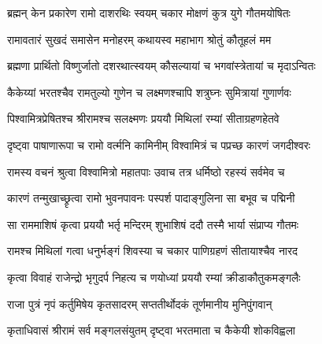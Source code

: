 


\storymeta



\twolineshloka
{ब्रह्मन् केन प्रकारेण रामो दाशरथिः स्वयम्}
{चकार मोक्षणं कुत्र युगे गौतमयोषितः}%


\twolineshloka
{रामावतारं सुखदं समासेन मनोहरम्}
{कथायस्व महाभाग श्रोतुं कौतूहलं मम}%


\twolineshloka
{ब्रह्मणा प्रार्थितो विष्णुर्जातो दशरथात्स्वयम्}
{कौसल्यायां च भगवांस्त्रेतायां च मृदाऽन्वितः}%


\twolineshloka
{कैकेय्यां भरतश्चैव रामतुल्यो गुणेन च}
{लक्ष्मणश्चापि शत्रुघ्नः सुमित्रायां गुणार्णवः}%


\twolineshloka
{पिश्वामित्रप्रेषितश्च श्रीरामश्च सलक्ष्मणः}
{प्रययौ मिथिलां रम्यां सीताग्रहणहेतवे}%


\twolineshloka
{दृष्ट्वा पाषाणारूपा च रामो वर्त्मनि कामिनीम्}
{विश्वामित्रं च पप्रच्छ कारणं जगदीश्वरः}%


\twolineshloka
{रामस्य वचनं श्रुत्वा विश्वामित्रो महातपाः}
{उवाच तत्र धर्मिष्ठो रहस्यं सर्वमेव च}%


\twolineshloka
{कारणं तन्मुखाच्छ्रृत्वा रामो भुवनपावनः}
{पस्पर्श पादाङ्गुलिना सा बभूव च पद्मिनी}%


\twolineshloka
{सा राममाशिषं कृत्वा प्रययौ भर्तृ मन्दिरम्}
{शुभाशिषं ददौ तस्मै भार्या संप्राप्य गौतमः}%


\twolineshloka
{रामश्च मिथिलां गत्वा धनुर्भङ्गं शिवस्या च}
{चकार पाणिग्रहणं सीतायाश्चैव नारद}%


\twolineshloka
{कृत्वा विवाहं राजेन्द्रो भृगुदर्प निहत्य च}
{णयोध्यां प्रययौ रम्यां क्रीडाकौतुकमङ्गलैः}%


\twolineshloka
{राजा पुत्रं नृपं कर्तुमिषेय कृतसादरम्}
{सप्ततीर्थोदकं तूर्णमानीय मुनिपुंगवान्}%


\twolineshloka
{कृताधिवासं श्रीरामं सर्व मङ्गलसंयुतम्}
{दृष्ट्वा भरतमाता च कैकेयी शोकविह्वला}%


